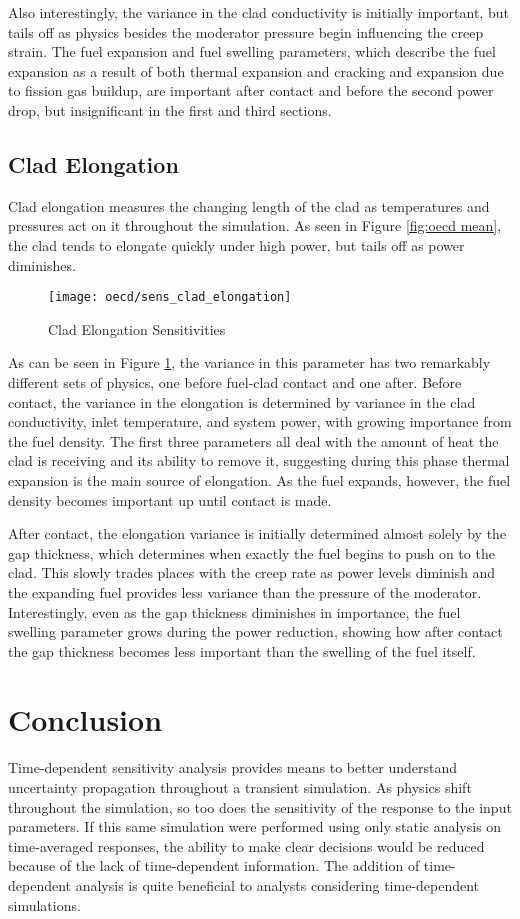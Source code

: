 Also interestingly, the variance in the clad conductivity is initially important, but tails off as physics
besides the moderator pressure begin influencing the creep strain.  The fuel expansion and fuel swelling
parameters, which describe the fuel expansion as a result of both thermal expansion and cracking and expansion
due to fission gas buildup, are important after contact and before the second power drop, but insignificant
in the first and third sections.


\subsection{Clad Elongation}
Clad elongation measures the changing length of the clad as temperatures and pressures act on it throughout
the simulation.  As seen in Figure \ref{fig:oecd mean}, the clad tends to elongate quickly under high power,
but tails off as power diminishes.
\begin{figure}[H]
  \centering
  \texttt{[image: oecd/sens\_clad\_elongation]}
  \caption{Clad Elongation Sensitivities}
  \label{fig:oecd elong}
\end{figure}
As can be seen in Figure \ref{fig:oecd elong}, the variance in this parameter has two remarkably different
sets of physics, one before fuel-clad contact and one after.  Before contact, the variance in the elongation
is determined by variance in the clad conductivity, inlet temperature, and system power, with growing
importance from the fuel density.  The first three parameters all deal with the amount of heat the clad is
receiving and its ability to remove it, suggesting during this phase thermal expansion is the main source of
elongation.  As the fuel expands, however, the fuel density becomes important up until contact is made.

After contact, the elongation variance is initially determined almost solely by the gap thickness, which determines
when exactly the fuel begins to push on to the clad.  This slowly trades places with the creep rate as power
levels diminish and the expanding fuel provides less variance than the pressure of the moderator.
Interestingly, even as the gap thickness diminishes in importance, the fuel swelling parameter grows during
the power reduction, showing how after contact the gap thickness becomes less important than the swelling of
the fuel itself.



\section{Conclusion}
Time-dependent sensitivity analysis provides means to better understand uncertainty propagation throughout a transient simulation.
As physics shift throughout the simulation, so too does the sensitivity of the response to the input parameters.  If this same
simulation were performed using only static analysis on time-averaged responses, the ability to make clear decisions would be
reduced because of the lack of time-dependent information.  The addition of time-dependent analysis is quite beneficial to 
analysts considering time-dependent simulations.

